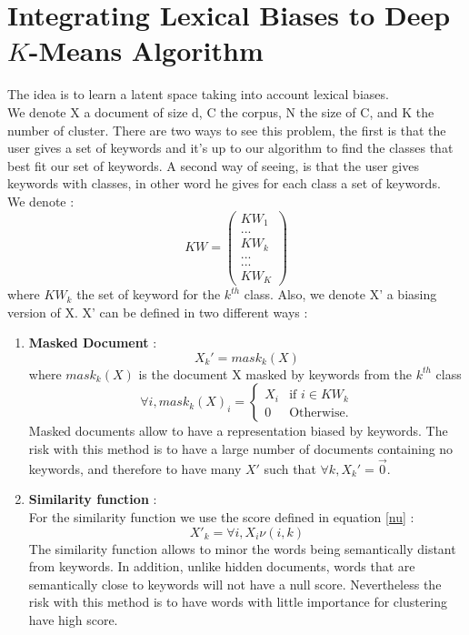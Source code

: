 \section{Integrating Lexical Biases to Deep $K$-Means Algorithm}
The idea is to learn a latent space taking into account lexical biases.
\\We denote  X a document of size d,
C the corpus, N the size of C, and K the number of cluster.
There are two ways to see this problem, the first is that the user gives a set 
of keywords and it's up to our algorithm to find the classes that best fit our 
set of keywords. A second way of seeing, is that the user gives keywords with 
classes, in other word he gives for each class a set of keywords.\\
We denote :
\begin{equation}
KW = \begin{pmatrix}KW_1  \\ ... \\ KW_k \\ ...\\ ... \\ KW_{K}\end{pmatrix}
\end{equation}
where $KW_k$ the set of keyword for the $k^{th}$ class. Also, we denote X' a biasing
version of X. X' can be defined in two different ways :
\begin{enumerate}
\item \textbf{Masked Document} :
\begin{equation}
X_k' = mask_k(X) 
\end{equation}
where $mask_k(X)$ is the document X masked by keywords from the $k^{th}$ class
\begin{equation}
\forall i, mask_k(X)_i = \left\{
\begin{array}{ll}
  X_i & \mbox{if } i \in KW_k\\
  0 & \mbox{Otherwise.}
\end{array}
\right. 
\end{equation}
Masked documents allow to have a representation biased by keywords. The risk 
with this method is to have a large number of documents containing no keywords, 
and therefore to have many $X'$ such that $\forall k, X_k' = \vec 0$. 
\item \textbf{Similarity function} :
\\For the similarity function we use the score defined in equation \ref{nu} :
\begin{equation}
   X'_k = \forall i, X_i \nu(i,k) 
\end{equation}
The similarity function allows to minor the words being semantically distant 
from keywords. In addition, unlike hidden documents, words that are 
semantically close to keywords will not have a null score. Nevertheless the 
risk with this method is to have words with little importance for clustering 
have high score.
\end{enumerate}
